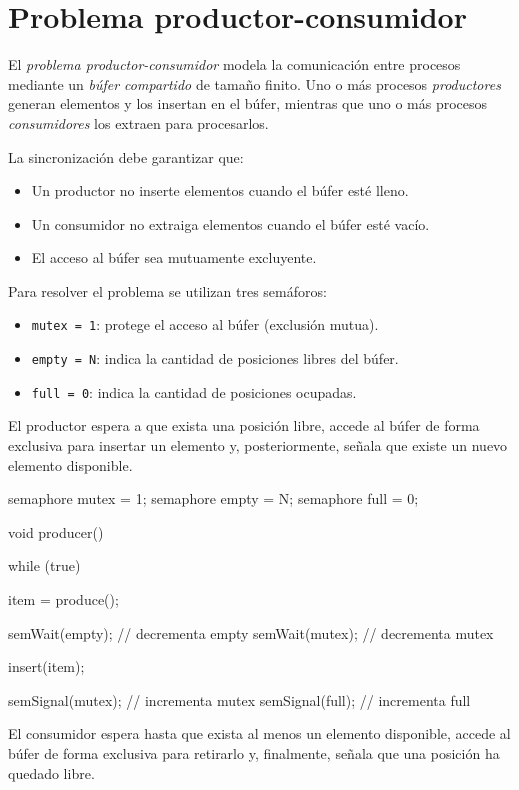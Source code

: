 \section{Problema productor-consumidor}

El \textit{problema productor-consumidor} modela la comunicación entre procesos mediante un \textit{búfer compartido} de tamaño finito. Uno o más procesos \textit{productores} generan elementos y los insertan en el búfer, mientras que uno o más procesos \textit{consumidores} los extraen para procesarlos.

La sincronización debe garantizar que:

\begin{itemize}
  \item Un productor no inserte elementos cuando el búfer esté lleno.
  \item Un consumidor no extraiga elementos cuando el búfer esté vacío.
  \item El acceso al búfer sea mutuamente excluyente.
\end{itemize}

Para resolver el problema se utilizan tres semáforos:

\begin{itemize}
  \item \texttt{mutex = 1}: protege el acceso al búfer (exclusión mutua).
  \item \texttt{empty = N}: indica la cantidad de posiciones libres del búfer.
  \item \texttt{full = 0}: indica la cantidad de posiciones ocupadas.
\end{itemize}

El productor espera a que exista una posición libre, accede al búfer de forma exclusiva para insertar un elemento y, posteriormente, señala que existe un nuevo elemento disponible.

\begin{ccode}[title=Implementación del productor]
semaphore mutex = 1;
semaphore empty = N;
semaphore full = 0;

void producer() {
  while (true) {
    item = produce();

    semWait(empty); // decrementa empty
    semWait(mutex); // decrementa mutex

    insert(item);

    semSignal(mutex); // incrementa mutex
    semSignal(full); // incrementa full
  }
}
\end{ccode}

El consumidor espera hasta que exista al menos un elemento disponible, accede al búfer de forma exclusiva para retirarlo y, finalmente, señala que una posición ha quedado libre.

